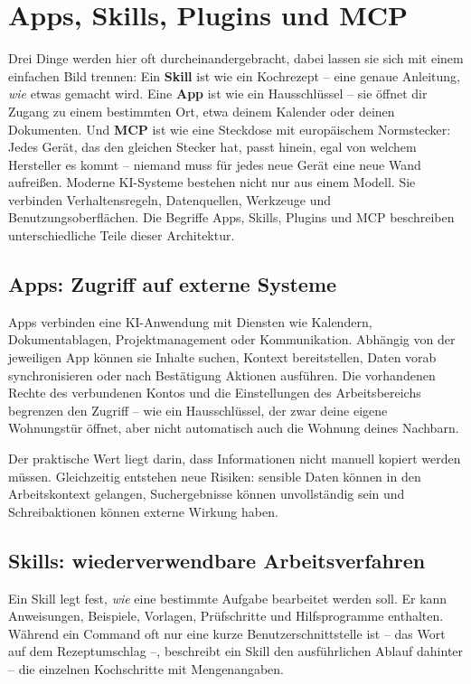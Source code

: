 \chapter{Apps, Skills, Plugins und MCP}

Drei Dinge werden hier oft durcheinandergebracht, dabei lassen sie sich mit einem einfachen Bild trennen: Ein \textbf{Skill} ist wie ein Kochrezept -- eine genaue Anleitung, \emph{wie} etwas gemacht wird. Eine \textbf{App} ist wie ein Hausschlüssel -- sie öffnet dir Zugang zu einem bestimmten Ort, etwa deinem Kalender oder deinen Dokumenten. Und \textbf{MCP} ist wie eine Steckdose mit europäischem Normstecker: Jedes Gerät, das den gleichen Stecker hat, passt hinein, egal von welchem Hersteller es kommt -- niemand muss für jedes neue Gerät eine neue Wand aufreißen. Moderne KI-Systeme bestehen nicht nur aus einem Modell. Sie verbinden Verhaltensregeln, Datenquellen, Werkzeuge und Benutzungsoberflächen. Die Begriffe Apps, Skills, Plugins und MCP beschreiben unterschiedliche Teile dieser Architektur.



\section{Apps: Zugriff auf externe Systeme}

Apps verbinden eine KI-Anwendung mit Diensten wie Kalendern, Dokumentablagen, Projektmanagement oder Kommunikation. Abhängig von der jeweiligen App können sie Inhalte suchen, Kontext bereitstellen, Daten vorab synchronisieren oder nach Bestätigung Aktionen ausführen. Die vorhandenen Rechte des verbundenen Kontos und die Einstellungen des Arbeitsbereichs begrenzen den Zugriff -- wie ein Hausschlüssel, der zwar deine eigene Wohnungstür öffnet, aber nicht automatisch auch die Wohnung deines Nachbarn.

Der praktische Wert liegt darin, dass Informationen nicht manuell kopiert werden müssen. Gleichzeitig entstehen neue Risiken: sensible Daten können in den Arbeitskontext gelangen, Suchergebnisse können unvollständig sein und Schreibaktionen können externe Wirkung haben.

\section{Skills: wiederverwendbare Arbeitsverfahren}

Ein Skill legt fest, \emph{wie} eine bestimmte Aufgabe bearbeitet werden soll. Er kann Anweisungen, Beispiele, Vorlagen, Prüfschritte und Hilfsprogramme enthalten. Während ein Command oft nur eine kurze Benutzerschnittstelle ist -- das Wort auf dem Rezeptumschlag --, beschreibt ein Skill den ausführlichen Ablauf dahinter -- die einzelnen Kochschritte mit Mengenangaben.

